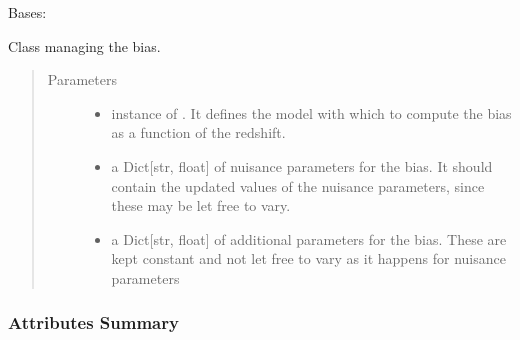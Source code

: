 \documentclass[letterpaper,10pt,english]{sphinxmanual}
\begin{document}
\begin{fulllineitems}
\label{\detokenize{api/seyfert.cosmology.bias.Bias:seyfert.cosmology.bias.Bias}}
\sphinxAtStartPar
Bases: 

\sphinxAtStartPar
Class managing the bias.
\begin{quote}\begin{description}
\item[{Parameters}] \leavevmode\begin{itemize}
\item {} 
\sphinxAtStartPar
{} \textendash{} instance of {\hyperref[\detokenize{api/seyfert.cosmology.bias.BiasModel:seyfert.cosmology.bias.BiasModel}]{}}. It defines the model with which to compute the
bias as a function of the redshift.

\item {} 
\sphinxAtStartPar
{} \textendash{} a Dict{[}str, float{]} of nuisance parameters for the bias. It should contain the updated
values of the nuisance parameters, since these may be let free to vary.

\item {} 
\sphinxAtStartPar
{} \textendash{} a Dict{[}str, float{]} of additional parameters for the bias. These are kept constant and not
let free to vary as it happens for nuisance parameters

\end{itemize}

\end{description}\end{quote}
\subsubsection*{Attributes Summary}


\begin{savenotes}\sphinxatlongtablestart\begin{longtable}[c]{}
\hline

\endfirsthead


\end{longtable}
\end{savenotes}
\end{fulllineitems}
\end{document}
